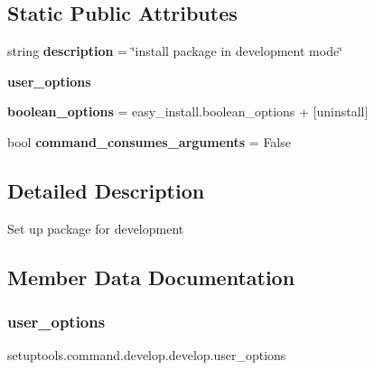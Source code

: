 \subsection*{Static Public Attributes}
\begin{DoxyCompactItemize}
\item 
\mbox{\label{classsetuptools_1_1command_1_1develop_1_1develop_ad0b736c0b475d9b6e91f3a2007950eca}} 
string {\bfseries description} = \char`\"{}install package in \textquotesingle{}development mode\textquotesingle{}\char`\"{}
\item 
{\bfseries user\+\_\+options}
\item 
\mbox{\label{classsetuptools_1_1command_1_1develop_1_1develop_a315988570a8a8d9bde570d8d94839c70}} 
{\bfseries boolean\+\_\+options} = easy\+\_\+install.\+boolean\+\_\+options + \mbox{[}\textquotesingle{}uninstall\textquotesingle{}\mbox{]}
\item 
\mbox{\label{classsetuptools_1_1command_1_1develop_1_1develop_a3f5eed7b2f2b49f9deb659dd706897b0}} 
bool {\bfseries command\+\_\+consumes\+\_\+arguments} = False
\end{DoxyCompactItemize}


\subsection{Detailed Description}
\begin{DoxyVerb}Set up package for development\end{DoxyVerb}
 

\subsection{Member Data Documentation}
\mbox{\label{classsetuptools_1_1command_1_1develop_1_1develop_a15c186fbc5a69ae8a812b79d24b72fe8}} 
\subsubsection{\texorpdfstring{user\+\_\+options}{user\_options}}
{\footnotesize\ttfamily setuptools.\+command.\+develop.\+develop.\+user\+\_\+options\hspace{0.3cm}{\ttfamily [static]}}


